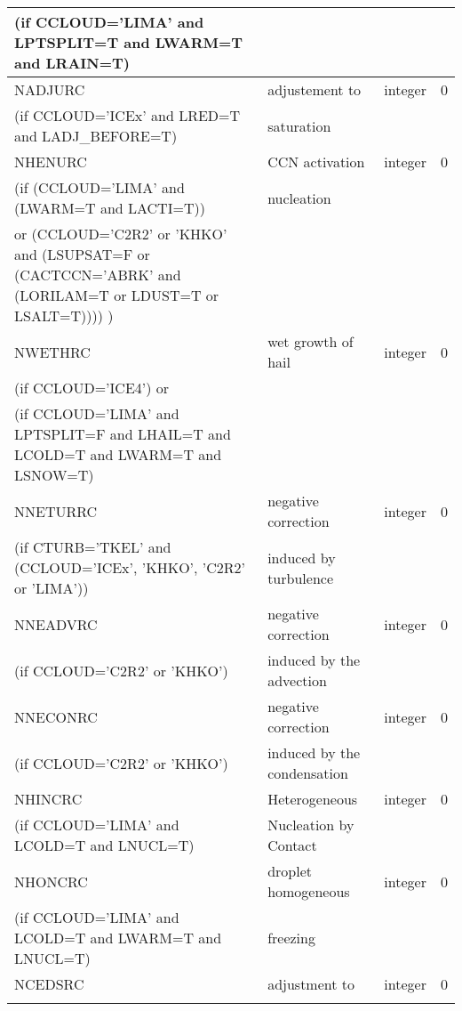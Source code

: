 \begin{longtable} {|p{}|p{}|>{\centering}p{}|p{}<{\centering}|}
(if CCLOUD='LIMA' and LPTSPLIT=T and LWARM=T and LRAIN=T) & &   &  \\\hline
NADJURC  & adjustement to & integer  &  0 \index{NADJURC!\innam{NAM\_BU\_RRC}}\\ \nopagebreak
(if CCLOUD='ICEx' and LRED=T and LADJ\_BEFORE=T) &saturation &   &  \\\hline
NHENURC  & CCN activation  & integer  &  0 \index{NHENURC!\innam{NAM\_BU\_RRC}}\\ \nopagebreak
(if (CCLOUD='LIMA' and (LWARM=T and LACTI=T)) & nucleation & & \\ \nopagebreak
 or (CCLOUD='C2R2' or 'KHKO' and (LSUPSAT=F or (CACTCCN='ABRK' and (LORILAM=T or LDUST=T or LSALT=T)))) ) & & & \\ \hline
NWETHRC  & wet growth of hail & integer  &  0 \index{NWETHRC!\innam{NAM\_BU\_RRC}}\\ \nopagebreak
(if CCLOUD='ICE4') or & &   &  \\ \nopagebreak
(if CCLOUD='LIMA' and LPTSPLIT=F and LHAIL=T and LCOLD=T and LWARM=T and LSNOW=T) & &   &  \\\hline
NNETURRC  &negative correction   & integer  &  0 \index{NNETURRC!\innam{NAM\_BU\_RRC}}\\ \nopagebreak
(if CTURB='TKEL' and (CCLOUD='ICEx', 'KHKO', 'C2R2' or 'LIMA'))   &induced by turbulence   &       &   \\\hline
NNEADVRC  & negative correction  & integer  &  0 \index{NNEADVRC!\innam{NAM\_BU\_RRC}}\\ \nopagebreak
(if CCLOUD='C2R2' or 'KHKO') & induced by the advection&   &  \\\hline
NNECONRC  &negative correction    & integer  &  0 \index{NNECONRC!\innam{NAM\_BU\_RRC}}\\ \nopagebreak
(if CCLOUD='C2R2' or 'KHKO') &induced by the condensation &   &  \\\hline
NHINCRC  & Heterogeneous  & integer  &  0 \index{NHINCRC!\innam{NAM\_BU\_RRC}}\\ \nopagebreak
(if CCLOUD='LIMA' and LCOLD=T and LNUCL=T)   & Nucleation by Contact  &       &   \\\hline
NHONCRC  & droplet homogeneous   & integer  &  0 \index{NHONCRC!\innam{NAM\_BU\_RRC}}\\ \nopagebreak
(if CCLOUD='LIMA' and LCOLD=T and LWARM=T and LNUCL=T)   &freezing   &       &   \\\hline
NCEDSRC  & adjustment to & integer  &  0 \index{NCEDSRC!\innam{NAM\_BU\_RRC}}\\ \nopagebreak

\end{longtable}
